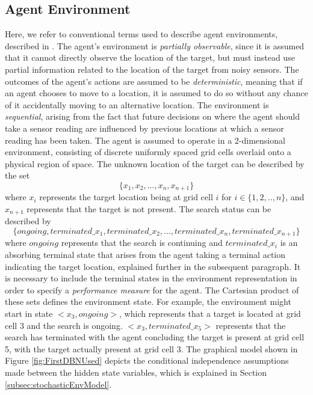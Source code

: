 \subsection{Agent Environment}
Here, we refer to conventional terms used to describe agent environments, described in \cite[p.~41]{AIAMA}. The agent's environment is \textit{partially observable}, since it is assumed that it cannot directly observe the location of the target, but must instead use partial information related to the location of the target from noisy sensors. The outcomes of the agent's actions are assumed to be \textit{deterministic}, meaning that if an agent chooses to move to a location, it is assumed to do so without any chance of it accidentally moving to an alternative location. The environment is \textit{sequential}, arising from the fact that future decisions on where the agent should take a sensor reading are influenced by previous locations at which a sensor reading has been taken. The agent is assumed to operate in a 2-dimensional environment, consisting of discrete uniformly spaced grid cells overlaid onto a physical region of space.
The unknown location of the target can be described by the set
\[\{x_1, x_2, ..., x_n, x_{n+1}\}\]
where $x_i$ represents the target location being at grid cell $i$ for $i \in \{1, 2, .., n\}$, and $x_{n+1}$ represents that the target is not present. The search status can be described by 
\[ \{ongoing, terminated\_x_1, terminated\_x_2, ..., terminated\_x_n, terminated\_x_{n+1}\} \]
where $ongoing$ represents that the search is continuing and $terminated\_x_i$ is an absorbing terminal state that arises from the agent taking a terminal action indicating the target location, explained further in the subsequent paragraph. It is necessary to include the terminal states in the environment representation in order to specify a \textit{performance measure} for the agent. 
The Cartesian product of these sets defines the environment state. For example, the environment might start in state $<x_3, ongoing>$, which represents that a target is located at grid cell 3 and the search is ongoing. $<x_3, terminated\_x_5>$ represents that the search has terminated with the agent concluding the target is present at grid cell 5, with the target actually present at grid cell 3. The graphical model shown in Figure \ref{fig:FirstDBNUsed} depicts the conditional independence assumptions made between the hidden state variables, which is explained in Section \ref{subsec:stochasticEnvModel}.
